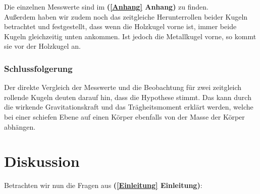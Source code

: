 \documentclass[11pt,a4paper,titlepage, ngerman]{article}
\begin{document}
				Die einzelnen Messwerte sind im \textbf{(\ref{Anhang} Anhang)} zu finden. \\

				Außerdem haben wir zudem noch das zeitgleiche Herunterrollen beider Kugeln betrachtet und festgestellt, dass wenn die Holzkugel vorne ist, immer beide Kugeln gleichzeitig unten ankommen. Ist jedoch die Metallkugel vorne, so kommt sie vor der Holzkugel an.	
				
			\subsubsection{Schlussfolgerung}
				\label{2.3.3}
				
				Der direkte Vergleich der Messwerte und die Beobachtung für zwei zeitgleich rollende Kugeln deuten darauf hin, dass die Hypothese stimmt.
				Das kann durch die wirkende Gravitationskraft und das Trägheitsmoment erklärt werden, welche bei einer schiefen Ebene auf einen Körper ebenfalls von der Masse der Körper abhängen.
				
	\vspace{1cm}
	\section{Diskussion}	
		\label{Diskussion}
		
		Betrachten wir nun die Fragen aus \textbf{(\ref{Einleitung} Einleitung)}: \\
		
\end{document}
